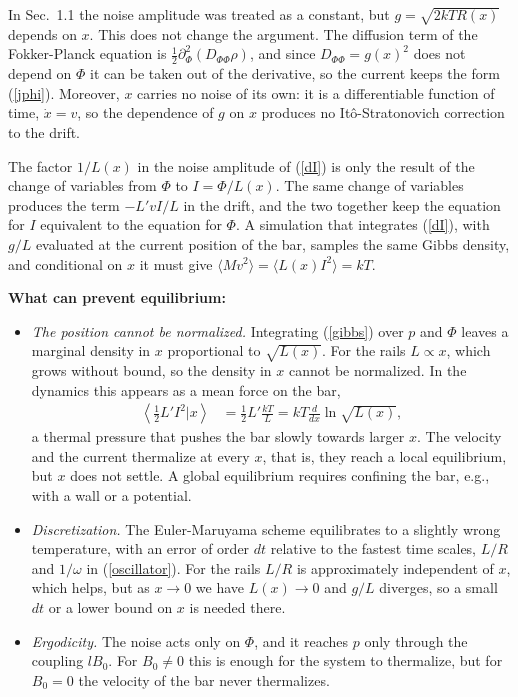 \documentclass[11pt]{article}
\begin{document}
In Sec.~1.1 the noise amplitude was treated as a constant, but $g=\sqrt{2kTR(x)}$ depends on $x$. This does not change the argument. The diffusion term of the Fokker-Planck equation is $\frac{1}{2}\partial_\Phi^2(D_{\Phi\Phi}\rho)$, and since $D_{\Phi\Phi}=g(x)^2$ does not depend on $\Phi$ it can be taken out of the derivative, so the current keeps the form (\ref{jphi}). Moreover, $x$ carries no noise of its own: it is a differentiable function of time, $\dot{x}=v$, so the dependence of $g$ on $x$ produces no It\^o-Stratonovich correction to the drift.

The factor $1/L(x)$ in the noise amplitude of (\ref{dI}) is only the result of the change of variables from $\Phi$ to $I=\Phi/L(x)$. The same change of variables produces the term $-L'vI/L$ in the drift, and the two together keep the equation for $I$ equivalent to the equation for $\Phi$. A simulation that integrates (\ref{dI}), with $g/L$ evaluated at the current position of the bar, samples the same Gibbs density, and conditional on $x$ it must give $\langle Mv^2\rangle=\langle L(x)I^2\rangle=kT$.

{\bf What can prevent equilibrium:}
\begin{itemize}
\item {\it The position cannot be normalized.} Integrating (\ref{gibbs}) over $p$ and $\Phi$ leaves a marginal density in $x$ proportional to $\sqrt{L(x)}$. For the rails $L\propto x$, which grows without bound, so the density in $x$ cannot be normalized. In the dynamics this appears as a mean force on the bar,
  \begin{align}
    \left<\frac{1}{2}L'I^2\Big|x\right>&=\frac{1}{2}L'\frac{kT}{L}=kT\frac{d}{dx}\ln\sqrt{L(x)},
  \end{align}
  a thermal pressure that pushes the bar slowly towards larger $x$. The velocity and the current thermalize at every $x$, that is, they reach a local equilibrium, but $x$ does not settle. A global equilibrium requires confining the bar, e.g., with a wall or a potential.
\item {\it Discretization.} The Euler-Maruyama scheme equilibrates to a slightly wrong temperature, with an error of order $dt$ relative to the fastest time scales, $L/R$ and $1/\omega$ in (\ref{oscillator}). For the rails $L/R$ is approximately independent of $x$, which helps, but as $x\to0$ we have $L(x)\to0$ and $g/L$ diverges, so a small $dt$ or a lower bound on $x$ is needed there.
\item {\it Ergodicity.} The noise acts only on $\Phi$, and it reaches $p$ only through the coupling $lB_0$. For $B_0\neq0$ this is enough for the system to thermalize, but for $B_0=0$ the velocity of the bar never thermalizes.
\end{itemize}
\end{document}

